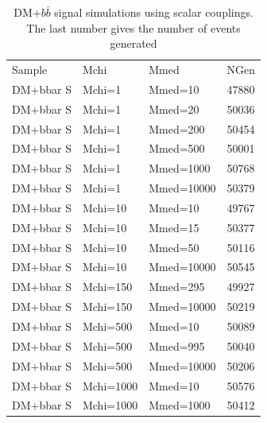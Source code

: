 \begin{table}[]
\centering
\begin{tabular}{llll}
\hline\hline
Sample & Mchi    & Mmed    & NGen \\
DM+bbar S & Mchi=1    & Mmed=10    & 47880 \\
DM+bbar S & Mchi=1    & Mmed=20    & 50036 \\
DM+bbar S & Mchi=1    & Mmed=200   & 50454 \\
DM+bbar S & Mchi=1    & Mmed=500   & 50001 \\
DM+bbar S & Mchi=1    & Mmed=1000  & 50768 \\
DM+bbar S & Mchi=1    & Mmed=10000 & 50379 \\
DM+bbar S & Mchi=10   & Mmed=10    & 49767 \\
DM+bbar S & Mchi=10   & Mmed=15    & 50377 \\
DM+bbar S & Mchi=10   & Mmed=50    & 50116 \\
DM+bbar S & Mchi=10   & Mmed=10000 & 50545 \\
DM+bbar S & Mchi=150  & Mmed=295   & 49927 \\
DM+bbar S & Mchi=150  & Mmed=10000 & 50219 \\
DM+bbar S & Mchi=500  & Mmed=10    & 50089 \\
DM+bbar S & Mchi=500  & Mmed=995   & 50040 \\
DM+bbar S & Mchi=500  & Mmed=10000 & 50206 \\
DM+bbar S & Mchi=1000 & Mmed=10    & 50576 \\
DM+bbar S & Mchi=1000 & Mmed=1000  & 50412\\
\hline \hline
\end{tabular}
\caption{DM+$b\bar{b}$ signal simulations using scalar couplings. The last number gives the number of events generated}
\label{tab:dmbb_s}
\end{table}




